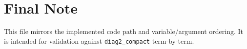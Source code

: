\documentclass{article}
\begin{document}
\section*{Final Note}
This file mirrors the implemented code path and variable/argument ordering.
It is intended for validation against \texttt{diag2\_compact} term-by-term.
\end{document}
